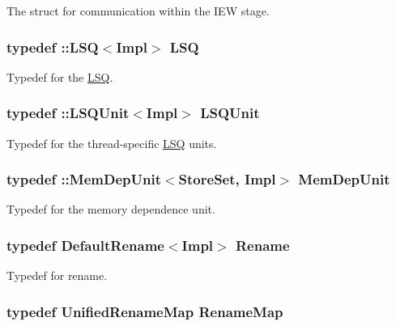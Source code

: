 \label{structSimpleCPUPolicy_ad9127d90dae1796b4dd1f07421b1ef72}
The struct for communication within the IEW stage. \hypertarget{structSimpleCPUPolicy_ac6e42f5c44d9943d2f822e3628791925}{
\subsubsection[{LSQ}]{\setlength{\rightskip}{0pt plus 5cm}typedef ::{\bf LSQ}$<$Impl$>$ {\bf LSQ}}}
\label{structSimpleCPUPolicy_ac6e42f5c44d9943d2f822e3628791925}
Typedef for the \hyperlink{classLSQ}{LSQ}. \hypertarget{structSimpleCPUPolicy_a689bc5ac0ae514f3534fd9fb266efeb3}{
\subsubsection[{LSQUnit}]{\setlength{\rightskip}{0pt plus 5cm}typedef ::{\bf LSQUnit}$<$Impl$>$ {\bf LSQUnit}}}
\label{structSimpleCPUPolicy_a689bc5ac0ae514f3534fd9fb266efeb3}
Typedef for the thread-\/specific \hyperlink{classLSQ}{LSQ} units. \hypertarget{structSimpleCPUPolicy_ad63764143a9c493ff3b22e54f84c469e}{
\subsubsection[{MemDepUnit}]{\setlength{\rightskip}{0pt plus 5cm}typedef ::{\bf MemDepUnit}$<${\bf StoreSet}, Impl$>$ {\bf MemDepUnit}}}
\label{structSimpleCPUPolicy_ad63764143a9c493ff3b22e54f84c469e}
Typedef for the memory dependence unit. \hypertarget{structSimpleCPUPolicy_a7f06d90367c68f062331dc9fc709a4e9}{
\subsubsection[{Rename}]{\setlength{\rightskip}{0pt plus 5cm}typedef {\bf DefaultRename}$<$Impl$>$ {\bf Rename}}}
\label{structSimpleCPUPolicy_a7f06d90367c68f062331dc9fc709a4e9}
Typedef for rename. \hypertarget{structSimpleCPUPolicy_a562b8208c64b62e61ceee341d2931e5c}{
\subsubsection[{RenameMap}]{\setlength{\rightskip}{0pt plus 5cm}typedef {\bf UnifiedRenameMap} {\bf RenameMap}}}
